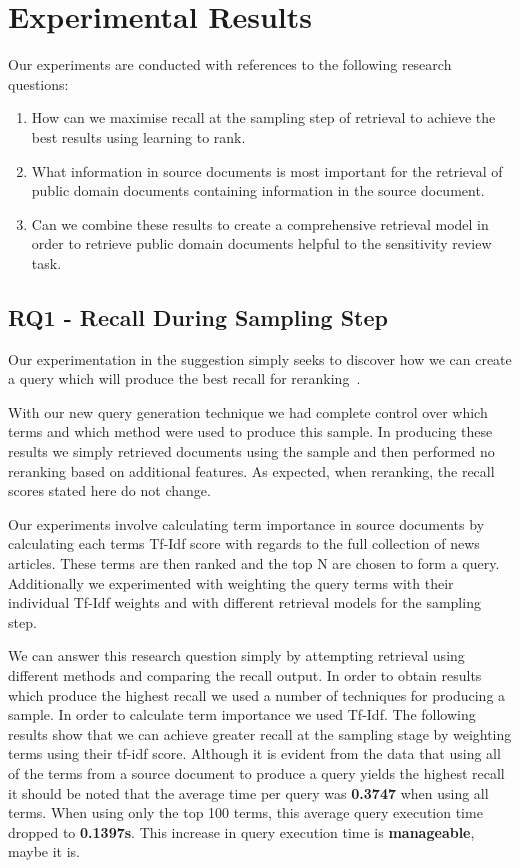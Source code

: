 \documentclass{mpaper}
\let\oldcite=\cite
\renewcommand\cite[1]{\ifthenelse{\equal{#1}{NEEDED}}{\ensuremath{^\texttt{[citation~needed]}}}{\oldcite{#1}}}
\begin{document}
\section{Experimental Results} \label{sec:results}
Our experiments are conducted with references to the following research questions:
\begin{enumerate}[label=\textbf{RQ.\arabic*}]
\item How can we maximise recall at the sampling step of retrieval to achieve the best results using learning to rank.
\item What information in source documents is most important for the retrieval of public domain documents containing information in the source document.
\item Can we combine these results to create a comprehensive retrieval model in order to retrieve public domain documents helpful to the sensitivity review task.
\end{enumerate}

\subsection{RQ1 - Recall During Sampling Step} \label{sec:RQ1}
Our experimentation in the suggestion simply seeks to discover how we can create a query which will produce the best recall for reranking~\cite{NEEDED}.

With our new query generation technique we had complete control over which terms and which method were used to produce this sample.
In producing these results we simply retrieved documents using the sample and then performed no reranking based on additional features. As expected, when reranking, the recall scores stated here do not change.

Our experiments involve calculating term importance in source documents by calculating each terms Tf-Idf score with regards to the full collection of news articles. These terms are then ranked and the top N are chosen to form a query. Additionally we experimented with weighting the query terms with their individual Tf-Idf weights and with different retrieval models for the sampling step.

We can answer this research question simply by attempting retrieval using different methods and comparing the recall output.
In order to obtain results which produce the highest recall we used a number of techniques for producing a sample. 
In order to calculate term importance we used Tf-Idf.
The following results show that we can achieve greater recall at the sampling stage by weighting terms using their tf-idf score.
Although it is evident from the data that using all of the terms from a source document to produce a query yields the highest recall it should be noted that the average time per query was \textbf{0.3747} when using all terms. When using only the top 100 terms, this average query execution time dropped to \textbf{0.1397s}.
This increase in query execution time is \textbf{manageable}, maybe it is.
\end{document}
